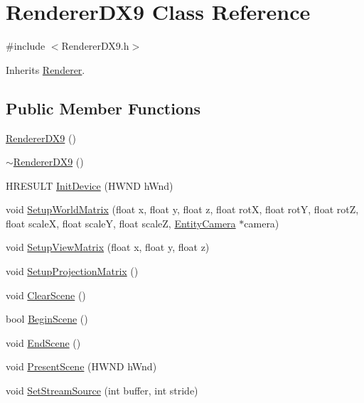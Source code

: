 \hypertarget{class_renderer_d_x9}{\section{Renderer\-D\-X9 Class Reference}
\label{class_renderer_d_x9}
}


{\ttfamily \#include $<$Renderer\-D\-X9.\-h$>$}



Inherits \hyperlink{class_renderer}{Renderer}.

\subsection*{Public Member Functions}
\begin{DoxyCompactItemize}
\item 
\hyperlink{class_renderer_d_x9_a48e1db7998052c7f39b731460da12e8a}{Renderer\-D\-X9} ()
\item 
\hyperlink{class_renderer_d_x9_a449f9dda67bfcc80a82f2f6c0d84b1d3}{$\sim$\-Renderer\-D\-X9} ()
\item 
H\-R\-E\-S\-U\-L\-T \hyperlink{class_renderer_d_x9_a691a441a358c841dc5189325b8e0b086}{Init\-Device} (H\-W\-N\-D h\-Wnd)
\item 
void \hyperlink{class_renderer_d_x9_a40a98a7212cd224b87b950a22911de76}{Setup\-World\-Matrix} (float x, float y, float z, float rot\-X, float rot\-Y, float rot\-Z, float scale\-X, float scale\-Y, float scale\-Z, \hyperlink{class_entity_camera}{Entity\-Camera} $\ast$camera)
\item 
void \hyperlink{class_renderer_d_x9_a3d23c1a33f09ac57d71c373d15475215}{Setup\-View\-Matrix} (float x, float y, float z)
\item 
void \hyperlink{class_renderer_d_x9_a7195bc2ed7ec550d8d89c3b6e23a3d77}{Setup\-Projection\-Matrix} ()
\item 
void \hyperlink{class_renderer_d_x9_affe5d73baddc5ee719a2b29a811007b6}{Clear\-Scene} ()
\item 
bool \hyperlink{class_renderer_d_x9_a77163ec49875c0584fc849f0f6fa14fa}{Begin\-Scene} ()
\item 
void \hyperlink{class_renderer_d_x9_a712e654baa65e8e05163a2a336a677eb}{End\-Scene} ()
\item 
void \hyperlink{class_renderer_d_x9_aae9ac91351b19ee6e77d9e1d7d5c3570}{Present\-Scene} (H\-W\-N\-D h\-Wnd)
\item 
void \hyperlink{class_renderer_d_x9_ab47cf24b00aea70cee4c15a8ce6fade7}{Set\-Stream\-Source} (int buffer, int stride)

\end{DoxyCompactItemize}
